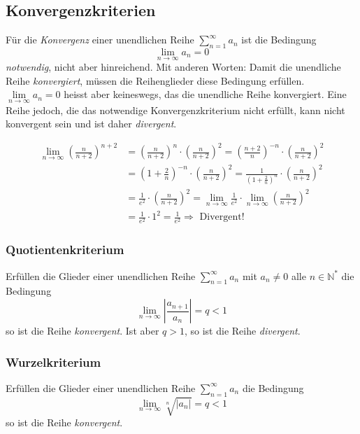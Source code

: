 \subsection{Konvergenzkriterien}
\begin{definition}Für die \textit{Konvergenz} einer unendlichen Reihe $\sum\limits_{n=1}^{\infty} a_n$ ist die Bedingung 
$$ \lim\limits_{n \rightarrow \infty} a_n = 0$$
\textit{notwendig}, nicht aber hinreichend. Mit anderen Worten: Damit die unendliche Reihe \textit{konvergiert}, müssen die Reihenglieder diese Bedingung erfüllen. $\lim\limits_{n \rightarrow \infty} a_n = 0$ heisst aber keineswegs, das die unendliche Reihe konvergiert. Eine Reihe jedoch, die das notwendige Konvergenzkriterium nicht erfüllt, kann nicht konvergent sein und ist daher \textit{divergent}.
\end{definition}
\begin{bsp}
\begin{align*}
	\lim\limits_{n \rightarrow \infty} \left(\frac{n}{n+2}\right)^{n+2} 	
		&= \left(\frac{n}{n+2}\right)^{n} \cdot \left(\frac{n}{n+2}\right)^{2}  
		= \left(\frac{n+2}{n}\right)^{-n} \cdot \left(\frac{n}{n+2}\right)^{2}\\
		&= \left(1 + \frac{2}{n}\right)^{-n} \cdot \left(\frac{n}{n+2}\right)^{2} 
		= \frac{1}{\left(1+\frac{2}{n}\right)^{n}} \cdot \left(\frac{n}{n+2}\right)^{2}\\
		&=\frac{1}{e^{2}} \cdot \left(\frac{n}{n+2}\right)^{2} 
		= \lim\limits_{n \rightarrow \infty} \frac{1}{e^2} \cdot \lim\limits_{n \rightarrow \infty} \left(\frac{n}{n+2}\right)^2 \\
		&= \frac{1}{e^2} \cdot 1^2 
		= \frac{1}{e^2} \Rightarrow \text{ Divergent! }
\end{align*}
\end{bsp}

\subsubsection*{Quotientenkriterium}
\begin{definition}
Erfüllen die Glieder einer unendlichen Reihe $\sum\limits_{n=1}^{\infty} a_n $ mit $ a_n \neq 0 $ alle $ n \in \mathbb{N}^*$ die Bedingung 
\[
\lim_{n \rightarrow \infty} \left| \frac{a_{n+1}}{a_n} \right|= q < 1
\]
so ist die Reihe \textit{konvergent}. Ist aber $q>1$, so ist die Reihe \textit{divergent}. 
\end{definition}

\subsubsection*{Wurzelkriterium}
\begin{definition}
Erfüllen die Glieder einer unendlichen Reihe $\sum\limits_{n=1}^{\infty} a_n $ die Bedingung 
\[
 \lim_{n \rightarrow \infty} \sqrt[n]{|a_n|} = q < 1
\]
so ist die Reihe \textit{konvergent}. 
\end{definition}

